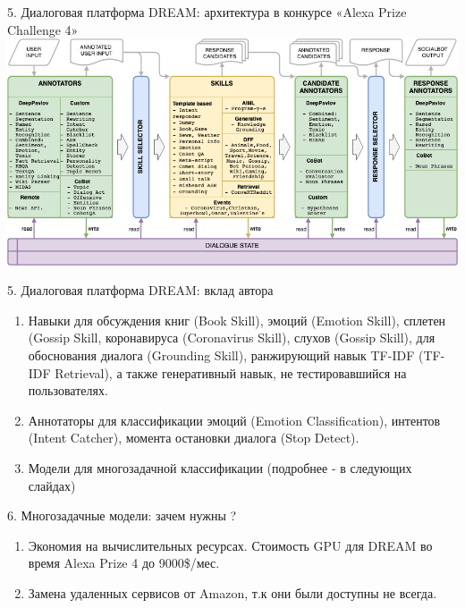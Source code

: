 \begin{frame}{5. Диалоговая платформа DREAM: архитектура в конкурсе «Alexa Prize Challenge 4»}
    \centering
    \includegraphics[width=1\linewidth]{images/Alexa2_.png} 
\end{frame}

\begin{frame}{5. Диалоговая платформа DREAM: вклад автора}
\begin{enumerate}
 \item Навыки для обсуждения книг (Book Skill), эмоций (Emotion Skill), сплетен (Gossip Skill, коронавируса (Coronavirus Skill), слухов (Gossip Skill), для обоснования диалога (Grounding Skill), ранжирующий навык TF-IDF (TF-IDF Retrieval), а также генеративный навык, не тестировавшийся на пользователях.
 \item Аннотаторы для классификации эмоций (Emotion Classification), интентов (Intent Catcher), момента остановки диалога (Stop Detect).
 \item Модели для многозадачной классификации (подробнее - в следующих слайдах)
\end{enumerate}
\end{frame}
\begin{frame}{6. Многозадачные модели: зачем нужны ?}
\begin{enumerate}
\item Экономия на вычислительных ресурсах. Стоимость GPU для DREAM во время Alexa Prize 4 до 9000\$/мес.
\item Замена удаленных сервисов от Amazon, т.к они были доступны не всегда.
\end{enumerate}
\end{frame}


